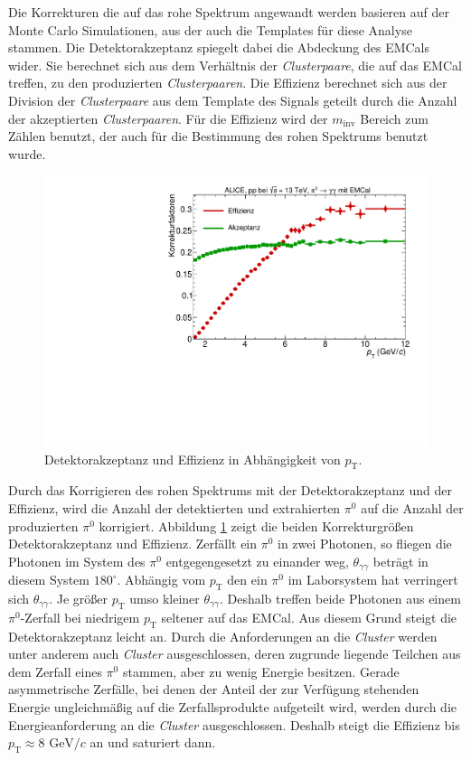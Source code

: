 Die Korrekturen die auf das rohe Spektrum angewandt werden basieren auf der Monte Carlo Simulationen, aus der auch die Templates für diese Analyse stammen.
\newline
Die Detektorakzeptanz spiegelt dabei die Abdeckung des EMCals wider.
Sie berechnet sich aus dem Verhältnis der \textit{Clusterpaare}, die auf das EMCal treffen, zu den produzierten \textit{Clusterpaaren}.
\newline
Die Effizienz berechnet sich aus der Division der \textit{Clusterpaare} aus dem Template des Signals geteilt durch die Anzahl der akzeptierten \textit{Clusterpaaren}.
Für die Effizienz wird der $m_\text{inv}$ Bereich zum Zählen benutzt, der auch für die Bestimmung des rohen Spektrums benutzt wurde.
\begin{figure}[t!]
\centering
\includegraphics[width=.65\linewidth]{Korrekturfaktoren_Data_2016.pdf}
\caption{Detektorakzeptanz und Effizienz in Abhängigkeit von $p_\text{T}$.
}
\label{fig:Korrekturen}
\end{figure}
\newline
Durch das Korrigieren des rohen Spektrums mit der Detektorakzeptanz und der Effizienz, wird die Anzahl der detektierten und extrahierten $\pi^{0}$ auf die Anzahl der produzierten $\pi^{0}$ korrigiert.
Abbildung \ref{fig:Korrekturen} zeigt die beiden Korrekturgrößen Detektorakzeptanz und Effizienz.
\newline
Zerfällt ein $\pi^{0}$ in zwei Photonen, so fliegen die Photonen im System des $\pi^{0}$ entgegengesetzt zu einander weg, $\theta_{\gamma\gamma}$ beträgt in diesem System $180^{\circ}$.
Abhängig vom $p_\text{T}$ den ein $\pi^{0}$ im Laborsystem hat verringert sich $\theta_{\gamma\gamma}$.
Je größer $p_\text{T}$ umso kleiner $\theta_{\gamma\gamma}$.
Deshalb treffen beide Photonen aus einem $\pi^{0}$-Zerfall bei niedrigem $p_\text{T}$ seltener auf das EMCal.
Aus diesem Grund steigt die Detektorakzeptanz leicht an.
\newline
Durch die Anforderungen an die \textit{Cluster} werden unter anderem auch \textit{Cluster} ausgeschlossen, deren zugrunde liegende Teilchen aus dem Zerfall eines $\pi^{0}$ stammen, aber zu wenig Energie besitzen.
Gerade asymmetrische Zerfälle, bei denen der Anteil der zur Verfügung stehenden Energie ungleichmäßig auf die Zerfallsprodukte aufgeteilt wird, werden durch die Energieanforderung an die \textit{Cluster} ausgeschlossen.
Deshalb steigt die Effizienz bis $p_\text{T} \approx 8 \text{ GeV}/c$ an und saturiert dann.